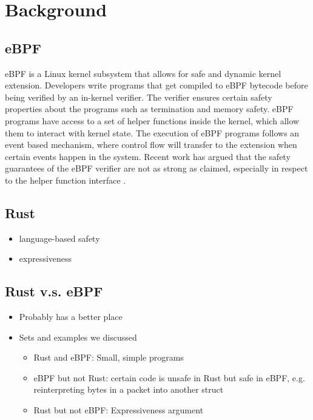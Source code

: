 \section{Background}

\subsection{eBPF}
eBPF is a Linux kernel subsystem that allows for safe and dynamic kernel extension.
Developers write programs that get compiled to eBPF bytecode before being verified by an in-kernel verifier.
The verifier ensures certain safety properties about the programs such as termination and memory safety.
eBPF programs have access to a set of helper functions inside the kernel, which allow them to interact with kernel state.
The execution of eBPF programs follows an event based mechanism, where control flow will transfer to the extension when certain events happen in the system.
Recent work has argued that the safety guarantees of the eBPF verifier are not as strong as claimed, especially in respect to the helper function interface \cite{untenableVerification}.


\subsection{Rust}

\begin{itemize}
    \item language-based safety
    \item expressiveness
\end{itemize}

\subsection{Rust v.s. eBPF}

\begin{itemize}
    \item Probably has a better place
    \item Sets and examples we discussed
        \begin{itemize}
            \item Rust and eBPF: Small, simple programs
            \item eBPF but not Rust: certain code is unsafe in Rust but safe in
                eBPF, e.g. reinterpreting bytes in a packet into another struct
            \item Rust but not eBPF: Expressiveness argument
        \end{itemize}
\end{itemize}
